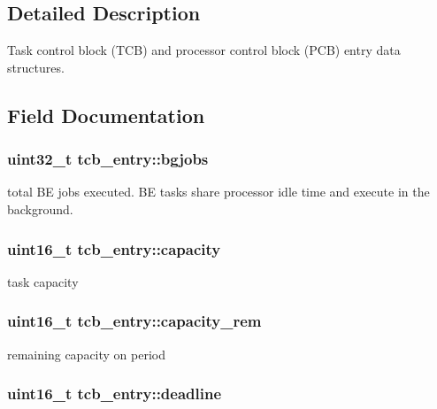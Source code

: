 \subsection{Detailed Description}
Task control block (T\-C\-B) and processor control block (P\-C\-B) entry data structures. 

\subsection{Field Documentation}
\hypertarget{structtcb__entry_a27631962295edabd283477b471f2d7ae}{
\subsubsection[{bgjobs}]{\setlength{\rightskip}{0pt plus 5cm}uint32\-\_\-t tcb\-\_\-entry\-::bgjobs}}\label{structtcb__entry_a27631962295edabd283477b471f2d7ae}
total B\-E jobs executed. B\-E tasks share processor idle time and execute in the background. \hypertarget{structtcb__entry_a2a3c8e5e81c910ccd845a8d1f58d550a}{
\subsubsection[{capacity}]{\setlength{\rightskip}{0pt plus 5cm}uint16\-\_\-t tcb\-\_\-entry\-::capacity}}\label{structtcb__entry_a2a3c8e5e81c910ccd845a8d1f58d550a}
task capacity \hypertarget{structtcb__entry_a559dce8ac2982d3c8f46808ddc52bbb9}{
\subsubsection[{capacity\-\_\-rem}]{\setlength{\rightskip}{0pt plus 5cm}uint16\-\_\-t tcb\-\_\-entry\-::capacity\-\_\-rem}}\label{structtcb__entry_a559dce8ac2982d3c8f46808ddc52bbb9}
remaining capacity on period \hypertarget{structtcb__entry_a14ef4f38d7589e42ac7847b2bcc3443f}{
\subsubsection[{deadline}]{\setlength{\rightskip}{0pt plus 5cm}uint16\-\_\-t tcb\-\_\-entry\-::deadline}}\label{structtcb__entry_a14ef4f38d7589e42ac7847b2bcc3443f}
